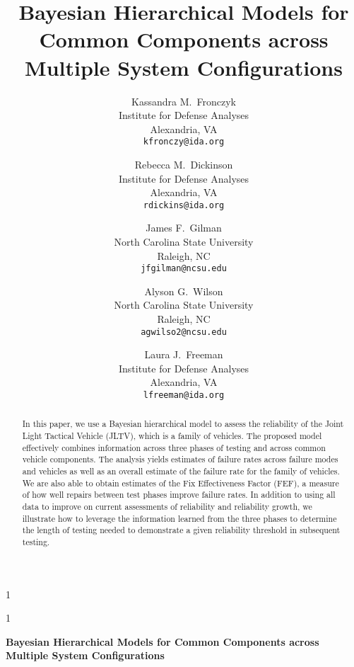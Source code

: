 \documentclass[12pt]{article}
\newcommand{\blind}{1}
\begin{document}
%

\def\spacingset#1{\renewcommand{\baselinestretch}%
{#1}\small\normalsize} \spacingset{1}



\blind
{
\title{Bayesian Hierarchical Models for Common Components across Multiple System Configurations}

\author{Kassandra M.\ Fronczyk\\Institute for Defense Analyses\\Alexandria, VA\\\texttt{kfronczy@ida.org} \and
Rebecca M.\ Dickinson\\Institute for Defense Analyses\\Alexandria, VA\\\texttt{rdickins@ida.org} \and
James F.\ Gilman\\North Carolina State University\\Raleigh, NC\\\texttt{jfgilman@ncsu.edu} \and
Alyson G.\ Wilson\\North Carolina State University\\Raleigh, NC\\\texttt{agwilso2@ncsu.edu} \and
Laura J.\ Freeman\\Institute for Defense Analyses\\Alexandria, VA\\\texttt{lfreeman@ida.org}}
\maketitle} \fi

\blind
{
  \bigskip
  \bigskip
  \bigskip
  \begin{center}
    {\LARGE\bf Bayesian Hierarchical Models for Common Components across Multiple System Configurations}
\end{center}
  \medskip
} \fi

\bigskip
\begin{abstract}
In this paper, we use a Bayesian hierarchical model to assess the reliability of the Joint Light Tactical Vehicle (JLTV), which is a family of vehicles. The proposed model effectively combines information across three phases of testing and across common vehicle components. The analysis yields estimates of failure rates across failure modes and vehicles as well as an overall estimate of the failure rate for the family of vehicles. We are also able to obtain estimates of the Fix Effectiveness Factor (FEF), a measure of how well repairs between test phases improve failure rates. In addition to using all data to improve on current assessments of reliability and reliability growth, we illustrate how to leverage the information learned from the three phases to determine the length of testing needed to demonstrate a given reliability threshold in subsequent testing.
\end{abstract}
\end{document}
